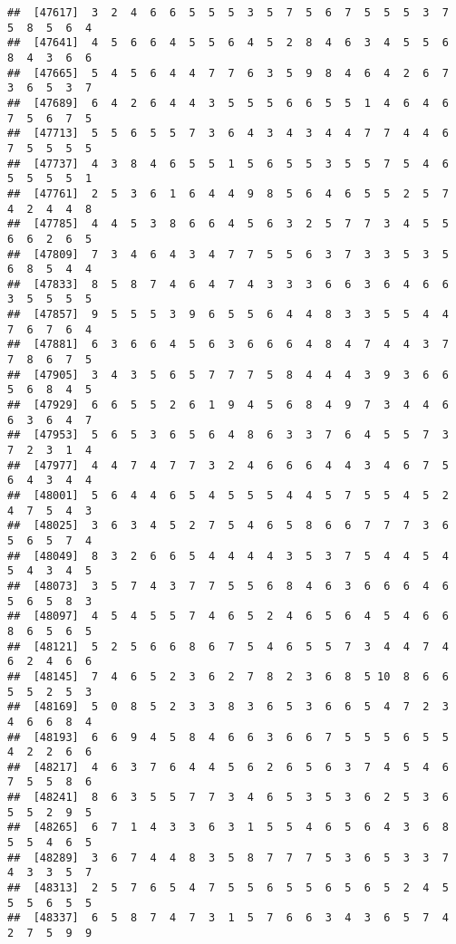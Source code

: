 \documentclass[
]{book}
\begin{document}
\begin{verbatim}
##  [47617]  3  2  4  6  6  5  5  5  3  5  7  5  6  7  5  5  5  3  7  5  8  5  6  4
##  [47641]  4  5  6  6  4  5  5  6  4  5  2  8  4  6  3  4  5  5  6  8  4  3  6  6
##  [47665]  5  4  5  6  4  4  7  7  6  3  5  9  8  4  6  4  2  6  7  3  6  5  3  7
##  [47689]  6  4  2  6  4  4  3  5  5  5  6  6  5  5  1  4  6  4  6  7  5  6  7  5
##  [47713]  5  5  6  5  5  7  3  6  4  3  4  3  4  4  7  7  4  4  6  7  5  5  5  5
##  [47737]  4  3  8  4  6  5  5  1  5  6  5  5  3  5  5  7  5  4  6  5  5  5  5  1
##  [47761]  2  5  3  6  1  6  4  4  9  8  5  6  4  6  5  5  2  5  7  4  2  4  4  8
##  [47785]  4  4  5  3  8  6  6  4  5  6  3  2  5  7  7  3  4  5  5  6  6  2  6  5
##  [47809]  7  3  4  6  4  3  4  7  7  5  5  6  3  7  3  3  5  3  5  6  8  5  4  4
##  [47833]  8  5  8  7  4  6  4  7  4  3  3  3  6  6  3  6  4  6  6  3  5  5  5  5
##  [47857]  9  5  5  5  3  9  6  5  5  6  4  4  8  3  3  5  5  4  4  7  6  7  6  4
##  [47881]  6  3  6  6  4  5  6  3  6  6  6  4  8  4  7  4  4  3  7  7  8  6  7  5
##  [47905]  3  4  3  5  6  5  7  7  7  5  8  4  4  4  3  9  3  6  6  5  6  8  4  5
##  [47929]  6  6  5  5  2  6  1  9  4  5  6  8  4  9  7  3  4  4  6  6  3  6  4  7
##  [47953]  5  6  5  3  6  5  6  4  8  6  3  3  7  6  4  5  5  7  3  7  2  3  1  4
##  [47977]  4  4  7  4  7  7  3  2  4  6  6  6  4  4  3  4  6  7  5  6  4  3  4  4
##  [48001]  5  6  4  4  6  5  4  5  5  5  4  4  5  7  5  5  4  5  2  4  7  5  4  3
##  [48025]  3  6  3  4  5  2  7  5  4  6  5  8  6  6  7  7  7  3  6  5  6  5  7  4
##  [48049]  8  3  2  6  6  5  4  4  4  4  3  5  3  7  5  4  4  5  4  5  4  3  4  5
##  [48073]  3  5  7  4  3  7  7  5  5  6  8  4  6  3  6  6  6  4  6  5  6  5  8  3
##  [48097]  4  5  4  5  5  7  4  6  5  2  4  6  5  6  4  5  4  6  6  8  6  5  6  5
##  [48121]  5  2  5  6  6  8  6  7  5  4  6  5  5  7  3  4  4  7  4  6  2  4  6  6
##  [48145]  7  4  6  5  2  3  6  2  7  8  2  3  6  8  5 10  8  6  6  5  5  2  5  3
##  [48169]  5  0  8  5  2  3  3  8  3  6  5  3  6  6  5  4  7  2  3  4  6  6  8  4
##  [48193]  6  6  9  4  5  8  4  6  6  3  6  6  7  5  5  5  6  5  5  4  2  2  6  6
##  [48217]  4  6  3  7  6  4  4  5  6  2  6  5  6  3  7  4  5  4  6  7  5  5  8  6
##  [48241]  8  6  3  5  5  7  7  3  4  6  5  3  5  3  6  2  5  3  6  5  5  2  9  5
##  [48265]  6  7  1  4  3  3  6  3  1  5  5  4  6  5  6  4  3  6  8  5  5  4  6  5
##  [48289]  3  6  7  4  4  8  3  5  8  7  7  7  5  3  6  5  3  3  7  4  3  3  5  7
##  [48313]  2  5  7  6  5  4  7  5  5  6  5  5  6  5  6  5  2  4  5  5  5  6  5  5
##  [48337]  6  5  8  7  4  7  3  1  5  7  6  6  3  4  3  6  5  7  4  2  7  5  9  9

\end{verbatim}
\end{document}

